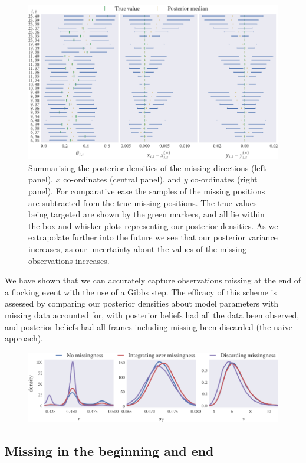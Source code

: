 \begin{figure}[tbp]
  \includegraphics{end/summary.pdf}
  \caption{Summarising the posterior densities of the missing directions (left
  panel), $x$ co-ordinates (central panel), and $y$ co-ordinates (right
  panel). For comparative ease the samples of the missing positions are
  subtracted from the true missing positions. The true values being
  targeted are shown by the green markers, and all lie within the box and
  whisker plots representing our posterior densities. As we extrapolate further
  into the future we see that our posterior variance increases, as our
  uncertainty about the values of the missing observations increases.}
  \label{fig:end_summary}
\end{figure}

We have shown that we can accurately capture observations missing at the end of
a flocking event with the use of a Gibbs step. The efficacy of this scheme is
assessed by comparing our posterior densities about model parameters with missing
data accounted for, with posterior beliefs had all the data been observed, and
posterior beliefs had all frames including missing been discarded (the naive
approach).

\begin{figure}
  \includegraphics{end/compare_params.pdf}
  \caption{}
  \label{fig:end_compare}
\end{figure}

\subsection{Missing in the beginning and end}


